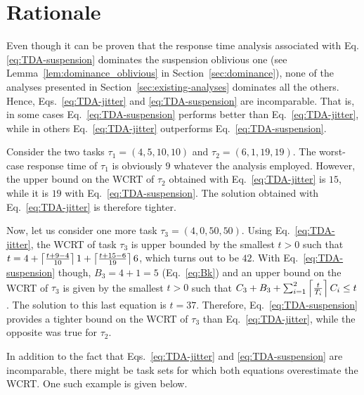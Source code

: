 \section{Rationale}
\label{sec:rationale}

Even though it can be proven that the response time analysis associated with Eq.\eqref{eq:TDA-suspension} dominates the suspension oblivious one (see Lemma~\ref{lem:dominance_oblivious} in Section~\ref{sec:dominance}), none of the analyses presented in Section~\ref{sec:existing-analyses} dominates all the others. Hence, Eqs.~\eqref{eq:TDA-jitter} and \eqref{eq:TDA-suspension} are incomparable. That is, in some cases Eq.~\eqref{eq:TDA-suspension} performs better than Eq.~\eqref{eq:TDA-jitter}, while in others Eq.~\eqref{eq:TDA-jitter} outperforms Eq.~\eqref{eq:TDA-suspension}.

\begin{example} 
\label{ex:rationale_1}  
Consider the two tasks $\tau_1 = (4, 5, 10, 10)$ and $\tau_2 =(6, 1, 19, 19)$. The worst-case response time of $\tau_1$ is obviously $9$ whatever the analysis employed. However, the upper bound on the WCRT of $\tau_2$ obtained with Eq.~\eqref{eq:TDA-jitter} is $15$, while it is $19$ with Eq.~\eqref{eq:TDA-suspension}. The solution obtained with Eq.~\eqref{eq:TDA-jitter} is therefore tighter.

Now, let us consider one more task $\tau_3 = (4, 0, 50, 50)$. Using Eq.~\eqref{eq:TDA-jitter}, the WCRT of task $\tau_3$ is upper bounded by the smallest $t>0$ such that
$t = 4 +\left\lceil{ \frac{t + 9 - 4}{10} }\right\rceil 1 +\left\lceil{ \frac{t + 15 - 6}{19} }\right\rceil 6$, which turns out to be $42$. With Eq.~\eqref{eq:TDA-suspension} though, $B_3 = 4+1 = 5$ (Eq.~\eqref{eq:Bk}) and an upper bound on the WCRT of $\tau_3$ is given by the smallest $t>0$ such that 
$C_3 + B_3 + \sum_{i=1}^{2}\left\lceil{\frac{t}{T_i}}\right\rceil C_i \leq t$. The solution to this last equation is $t=37$. Therefore, Eq.~\eqref{eq:TDA-suspension} provides a tighter bound on the WCRT of $\tau_3$ than Eq.~\eqref{eq:TDA-jitter}, while the opposite was true for $\tau_2$.
\hfill\myendproof
\end{example}

In addition to the fact that Eqs.~\eqref{eq:TDA-jitter} and \eqref{eq:TDA-suspension} are incomparable, there might be task sets for which both equations overestimate the WCRT. One such example is given below.
 
